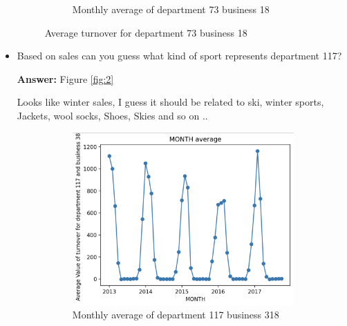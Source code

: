 \begin{itemize}
\begin{figure}[htbp]
\begin{subfigure}[b]{0.45\textwidth}
            \caption{Monthly average of department 73 business 18}
            \label{fig:1.2}
        \end{subfigure}
        \caption{Average turnover for department 73 business 18}
        \label{fig:1}
    \end{figure}

    \item Based on sales can you guess what kind of sport represents department 117?\par \textbf{Answer:} Figure \ref{fig:2} \par
    Looks like winter sales, I guess it should be related to ski, winter sports, Jackets, wool socks, Shoes, Skies and so on ..\par

    \begin{figure}[htbp]
        \centering
        \begin{subfigure}[b]{0.45\textwidth}
            \centering
            \includegraphics[width=\textwidth]{figures/monthly_avg_117.png}
            \caption{Monthly average of department 117 business 318}
            \label{fig:2.1}
        \end{subfigure}
        \hfill
        \begin{subfigure}[b]{0.45\textwidth}
            \centering

\end{subfigure}
\end{figure}
\end{itemize}
